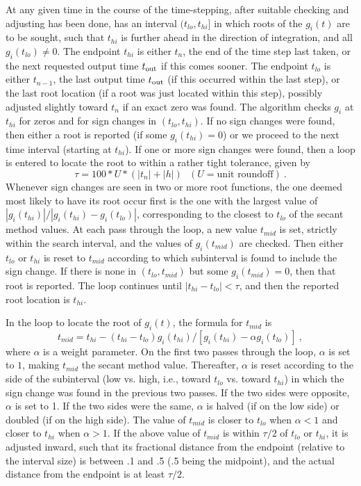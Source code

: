 At any given time in the course of the time-stepping, after suitable
checking and adjusting has been done, {\cvodes} has an interval
$(t_{lo},t_{hi}]$ in which roots of the $g_i(t)$ are to be sought, such
that $t_{hi}$ is further ahead in the direction of integration, and
all $g_i(t_{lo}) \neq 0$.  The endpoint $t_{hi}$ is either $t_n$,
the end of the time step last taken, or the next requested output time
$t_{\mbox{\scriptsize out}}$ if this comes sooner.  The endpoint
$t_{lo}$ is either $t_{n-1}$, the last output time
$t_{\mbox{\scriptsize out}}$ (if this occurred within the last
step), or the last root location (if a root was just located within
this step), possibly adjusted slightly toward $t_n$ if an exact zero
was found.  The algorithm checks $g_i$ at $t_{hi}$ for zeros and for
sign changes in $(t_{lo},t_{hi})$.  If no sign changes were found, then
either a root is reported (if some $g_i(t_{hi}) = 0$) or we proceed to
the next time interval (starting at $t_{hi}$).  If one or more sign
changes were found, then a loop is entered to locate the root to
within a rather tight tolerance, given by
\[ \tau = 100 * U * (|t_n| + |h|)~~~ (U = \mbox{unit roundoff}) ~. \]
Whenever sign changes are seen in two or more root functions, the one
deemed most likely to have its root occur first is the one with the
largest value of $|g_i(t_{hi})|/|g_i(t_{hi}) - g_i(t_{lo})|$,
corresponding to the closest to $t_{lo}$ of the secant method values.
At each pass through the loop, a new value $t_{mid}$ is set, strictly
within the search interval, and the values of $g_i(t_{mid})$ are
checked.  Then either $t_{lo}$ or $t_{hi}$ is reset to $t_{mid}$
according to which subinterval is found to include the sign change.  If
there is none in $(t_{lo},t_{mid})$ but some $g_i(t_{mid}) = 0$, then
that root is reported.  The loop continues until
$|t_{hi}-t_{lo}| < \tau$, and then the reported root location is
$t_{hi}$.

In the loop to locate the root of $g_i(t)$, the formula for $t_{mid}$
is
\[ t_{mid} = t_{hi} - (t_{hi} - t_{lo})
             g_i(t_{hi}) / [g_i(t_{hi}) - \alpha g_i(t_{lo})] ~, \]
where $\alpha$ is a weight parameter.  On the first two passes through
the loop, $\alpha$ is set to $1$, making $t_{mid}$ the secant method
value.  Thereafter, $\alpha$ is reset according to the side of the
subinterval (low vs. high, i.e., toward $t_{lo}$ vs. toward $t_{hi}$)
in which the sign change was found in the previous two passes.  If the
two sides were opposite, $\alpha$ is set to 1.  If the two sides were
the same, $\alpha$ is halved (if on the low side) or doubled (if on
the high side).  The value of $t_{mid}$ is closer to $t_{lo}$ when
$\alpha < 1$ and closer to $t_{hi}$ when $\alpha > 1$.  If the above
value of $t_{mid}$ is within $\tau/2$ of $t_{lo}$ or $t_{hi}$, it is
adjusted inward, such that its fractional distance from the endpoint
(relative to the interval size) is between .1 and .5 (.5 being the
midpoint), and the actual distance from the endpoint is at least
$\tau/2$.


